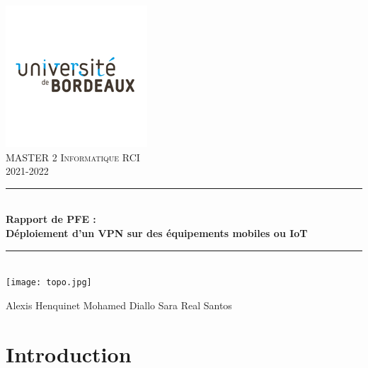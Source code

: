\documentclass[12pt, openany]{report}
\begin{document}
\begin{titlepage}
  \begin{sffamily}
  \begin{center}
	\includegraphics[scale=0.5]{ub.png}~\\[1cm]

    \textsc{\Large MASTER 2 Informatique RCI }\\[1.5cm]
    2021-2022

    \rule{1\linewidth}{2pt}
     \\[1cm]
    { \huge \bfseries Rapport de PFE :\\
    Déploiement d'un VPN sur des équipements mobiles ou IoT\\[1cm] }
    \rule{1\linewidth}{2pt}
    \\[1cm]
    \texttt{[image: topo.jpg]}
    \\ %

   \vfill
      \begin{center}
        \Large	 Alexis Henquinet \hspace*{1cm} Mohamed Diallo \hspace*{1cm} Sara Real Santos
      \end{center}
 
 
  \end{center}
  \end{sffamily}
\end{titlepage}

\newpage

\renewcommand{\contentsname}{Sommaire}
\tableofcontents
\newpage

\section{Introduction}
\end{document}
